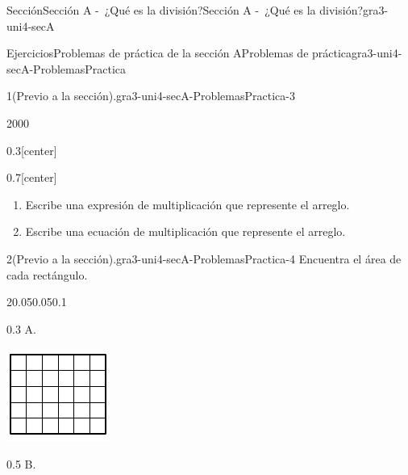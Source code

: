 \documentclass[twoside,10pt,]{article}
\begin{document}
\begin{sectionptx}{Sección}{Sección A -~¿Qué es la división?}{}{Sección A -~¿Qué es la división?}{}{}{gra3-uni4-secA}
\begin{exercises-subsection}{Ejercicios}{Problemas de práctica de la sección A}{}{Problemas de práctica}{}{}{gra3-uni4-secA-ProblemasPractica}
\begin{divisionexercise}{1}{(Previo a la sección).}{}{gra3-uni4-secA-ProblemasPractica-3}
\begin{sidebyside}{2}{0}{0}{0}
\begin{sbspanel}{0.3}[center]
\end{sbspanel}%
\begin{sbspanel}{0.7}[center]%
%
\begin{enumerate}[label=(\alph*)]
\item{}Escribe una expresión de multiplicación que represente el arreglo.%
\item{}Escribe una ecuación de multiplicación que represente el arreglo.%
\end{enumerate}
%
\end{sbspanel}%
\end{sidebyside}%
\end{divisionexercise}%
\begin{divisionexercise}{2}{(Previo a la sección).}{}{gra3-uni4-secA-ProblemasPractica-4}%
Encuentra el área de cada rectángulo.%
\begin{sidebyside}{2}{0.05}{0.05}{0.1}%
\begin{sbspanel}{0.3}%
A.%
\par
\includegraphics[width=\linewidth]{external/svg-source/tikz-file-151669.pdf}
\end{sbspanel}%
\begin{sbspanel}{0.5}%
B.%
\par

\end{sbspanel}
\end{sidebyside}
\end{divisionexercise}
\end{exercises-subsection}
\end{sectionptx}
\end{document}
